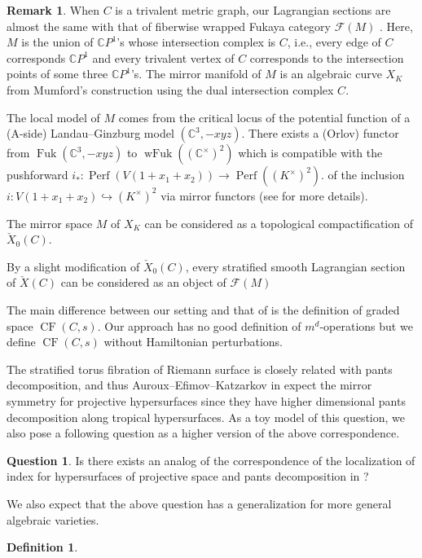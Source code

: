 \documentclass[a4paper,dvipdfmx,reqno,12pt]{amsart}
\theoremstyle{definition}
\newtheorem{Def}[Thm]{Definition}
\newtheorem{Ques}[Thm]{Question}
\newtheorem{Rmk}[Thm]{Remark}
\newcommand{\C}{\mathbb{C}}%
\newcommand{\mcal}[1]{\mathcal{#1}}%
\newcommand{\opn}[1]{\operatorname{#1}}
\newcommand{\hookto}{\hookrightarrow}
\numberwithin{equation}{section}
\begin{document}
\begin{Rmk} \label{rmk: curve_mirror}
When $C$ is a trivalent metric graph, 
our Lagrangian sections are 
almost the same with that of fiberwise wrapped Fukaya category 
$\mcal{F}(M)$ \cite[3.1]{auroux2022lagrangian}.
Here, $M$ is the
union of $\C P^{1}$'s whose intersection complex is $C$, 
i.e., every edge of $C$ corresponds
$\C P^{1}$ and every trivalent vertex of $C$ corresponds
to the intersection points of some three $\C P^{1}$'s.
The mirror manifold of $M$ is an algebraic curve $X_K$
from Mumford's construction using the dual intersection
complex $C$.

The local model of $M$ comes from the critical locus
of the potential function of a (A-side) Landau--Ginzburg 
model $(\C^{3},-xyz)$. There exists a (Orlov) functor
from $\opn{Fuk}(\C^{3},-xyz)$ 
to $\opn{wFuk}((\C^{\times})^2)$ which is compatible
with the pushforward 
$i_*:\opn{Perf}(V(1+x_1+x_2))\to \opn{Perf}((K^{\times})^{2})$. 
of the inclusion $i:V(1+x_1+x_2)\hookto (K^{\times})^2$
via mirror functors (see \cite[2.]{auroux2022lagrangian}
for more details). 

The mirror space $M$ of $X_K$ can be considered as a 
topological compactification of $\check{X}_0(C)$.

By a slight modification of $\check{X}_0(C)$, every 
stratified smooth Lagrangian section of $\check{X}(C)$ 
can be considered as an object of $\mcal{F}(M)$

The main difference between our setting and 
that of \cite{auroux2022lagrangian} 
is the definition of graded space $\opn{CF}(C,s)$. 
Our approach has no good definition 
of $m^{d}$-operations but we define $\opn{CF}(C,s)$ 
without Hamiltonian
perturbations.
\end{Rmk}

The stratified torus fibration of Riemann surface is 
closely related with pants decomposition, and thus
Auroux--Efimov--Katzarkov in \cite{auroux2022lagrangian} expect the mirror symmetry 
for projective hypersurfaces since they have higher 
dimensional pants decomposition \cite{MR2079993} along
tropical hypersurfaces.
As a toy model of this question, we also pose a 
following question as a higher version of the 
above correspondence.
\begin{Ques}
Is there exists an analog of the correspondence of the 
localization of index for
hypersurfaces of projective space and pants decomposition 
in \cite{MR2079993}?
\end{Ques}
We also expect that the above question has a generalization
for more general algebraic varieties.
\begin{Def} \label{def: weighted_lattice_points}

\end{Def}
\end{document}
